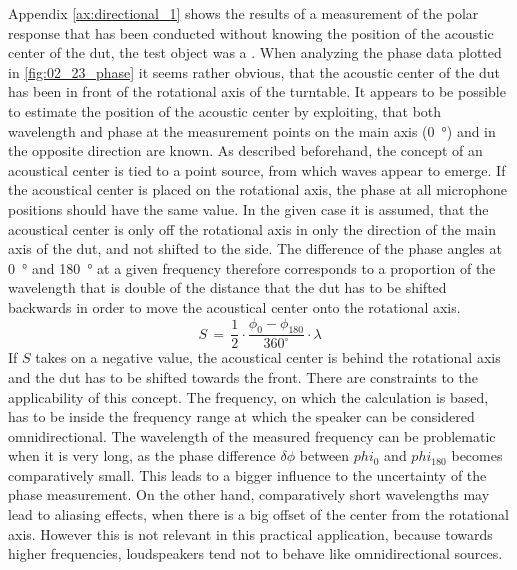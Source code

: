 Appendix \ref{ax:directional_1} shows the results of a measurement of the polar response that has been conducted without knowing the position of the acoustic center of the \gls{dut}, the test object was a \citep{seas33}. 
When analyzing the phase data plotted in \autoref{fig:02_23_phase} it seems rather obvious, that the acoustic center of the \gls{dut} has been in front of the rotational axis of the turntable. 
It appears to be possible to estimate the position of the acoustic center by exploiting, that both wavelength and phase at the measurement points on the main axis (\SI{0}{\degree}) and in the opposite direction are known. As described beforehand, the concept of an acoustical center is tied to a  point source, from which waves appear to emerge. If the acoustical center is placed  on the rotational axis, the phase at all microphone positions should have the same value. In the given case it is assumed, that the acoustical center is only off the rotational axis in only the direction of the main axis of the \gls{dut}, and not shifted to the side.
The difference of the phase angles at \SI{0}{\degree} and \SI{180}{\degree} at a given frequency therefore corresponds to a proportion of the wavelength that is double of the distance that the \gls{dut} has to be shifted backwards in order to move the acoustical center onto the rotational axis.
\begin{equation}
S\,=\,\frac{1}{2}\cdot\frac{\phi_0-\phi_{180}}{360^\circ}\cdot\lambda
\end{equation}
\startexplain
\stopexplain    
If \(S\) takes on a negative value, the acoustical center is behind the rotational axis and the \gls{dut} has to be shifted towards the front. There are constraints to the applicability of this concept. The frequency, on which the calculation is based, has to be inside the frequency range at which the speaker can be considered omnidirectional.
The wavelength of the measured frequency can be problematic when it is very long, as the phase difference \(\delta\phi\) between \(phi_0\) and \(phi_{180}\) becomes comparatively small. This leads to a bigger influence to the uncertainty of the phase measurement. On the other hand, comparatively short wavelengths may lead to aliasing effects, when there is a big offset of the center from the rotational axis. However this is not relevant in this practical application, because towards higher frequencies, loudspeakers tend not to behave like omnidirectional sources.\\
